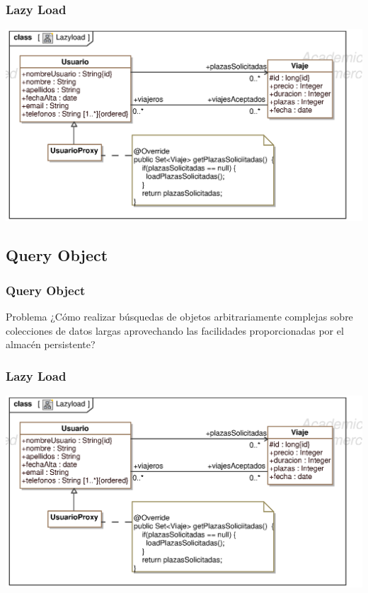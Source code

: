 \documentclass[a4paper,slidestop,xcolor=pst,blue]{beamer}
\begin{document}
\begin{frame}[c]
    \frametitle{Lazy Load}
    \begin{center}
        \includegraphics[width=0.9\linewidth]{images/behaviour/lazyLoad.eps}
    \end{center}
\end{frame}

\subsection{Query Object}

\begin{frame}[c]
    \frametitle{Query Object}
    \begin{block}{Problema}
        ¿Cómo realizar búsquedas de objetos arbitrariamente complejas sobre colecciones de datos largas aprovechando las facilidades proporcionadas por el almacén persistente?
    \end{block}
\end{frame}

\begin{frame}[c]
    \frametitle{Lazy Load}
    \begin{center}
        \includegraphics[width=0.9\linewidth]{images/behaviour/lazyLoad.eps}
    \end{center}
\end{frame}
 
\end{document}
